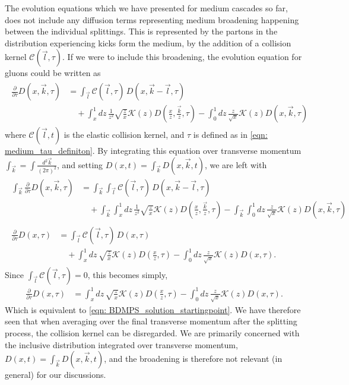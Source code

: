 \documentclass[main.tex]{subfiles}
\begin{document}
The evolution equations which we have presented for medium cascades so far, does not include any diffusion terms representing medium broadening happening between the individual splittings. This is represented by the partons in the distribution experiencing kicks form the medium, by the addition of a collision kernel \(\mathcal{C}(\vec l, \tau)\). If we were to include this broadening, the evolution equation for gluons could be written as~\cite{Probabilistic_picture, system_of_evolutionequations}
\begin{align}\label{eqn: BDMPSZ_3.19_ProbPic}
    \begin{split}
    \frac{\partial}{\partial \tau} D(x,\vec k, \tau) &= \int_{\vec l}\mathcal{C}(\vec l,\tau) \, D(x, \vec k - \vec l, \tau) \\
    &\quad + \int_x^1 dz\, \frac{1
    }{z^2} \sqrt{\frac{z}{x}} \mathcal{K}(z) D\left(\frac{x}{z}, \frac{\vec k}{z}, \tau\right) - \int_0^1 dz\, \frac{z}{\sqrt{x}} \mathcal{K}(z) D(x,\vec k, \tau)
    \end{split}
\end{align}
where \(\mathcal{C}(\vec l,t)\) is the elastic collision kernel, and \(\tau\) is defined as in \autoref{eqn: medium_tau_definiton}. By integrating this equation over transverse momentum \(\int_{\vec k} = \int \frac{d^2 \vec k}{(2\pi)^2}\), and setting \(D(x,t) = \int_{\vec k} D(x, \vec k, t)\), we are left with
\begin{align}
    \begin{split}
    \int_{\vec k} \frac{\partial}{\partial \tau} D(x,\vec k, \tau) &= \int_{\vec k} \int_{\vec l}\mathcal{C}(\vec l,\tau) \, D(x, \vec k - \vec l, \tau) \\
    &\quad +  \int_{\vec k} \int_x^1 dz\, \frac{1}{z^2} \sqrt{\frac{z}{x}} \mathcal{K}(z) D\left(\frac{x}{z}, \frac{\vec k}{z}, \tau\right) - \int_{\vec k} \int_0^1 dz\,\frac{z}{\sqrt{x}} \mathcal{K}(z) D(x,\vec k, \tau)
    \end{split}\\
    \begin{split}
    \frac{\partial}{\partial \tau} D(x, \tau) &= \int_{\vec l}\mathcal{C}(\vec l,\tau) \, D(x, \tau) \\
    &\quad + \int_x^1 dz\, \sqrt{\frac{z}{x}} \mathcal{K}(z) D\left(\frac{x}{z}, \tau\right) - \int_0^1 dz\, \frac{z}{\sqrt{x}} \mathcal{K}(z) D(x, \tau).
    \end{split}
\end{align}
Since \(\int_{\vec l} \mathcal{C}(\vec l, \tau) = 0\), this becomes simply, 
\begin{align}
     \frac{\partial}{\partial \tau} D(x, \tau) &= \int_x^1 dz\, \sqrt{\frac{z}{x}} \mathcal{K}(z) D\left(\frac{x}{z}, \tau\right) - \int_0^1 dz\, \frac{z}{\sqrt{x}} \mathcal{K}(z) D(x, \tau).
\end{align}
Which is equivalent to \autoref{eqn: BDMPS_solution_startingpoint}. We have therefore seen that when averaging over the final transverse momentum after the splitting process, the collision kernel can be disregarded. We are primarily concerned with the inclusive distribution integrated over transverse momentum, \(D(x,t) = \int_{\vec k} D(x, \vec k, t)\), and the broadening is therefore not relevant (in general) for our discussions.
\end{document}
